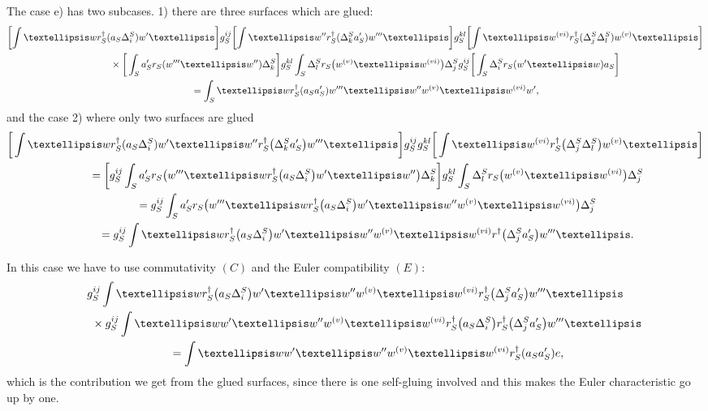 \documentclass[11pt]{article}
\def\idagger{r^{\dagger}}
\def\res{r}
\begin{document}
The case e) has two subcases. 1) there are three surfaces which are
glued:
\begin{gather*}
\bigg[\!\int \dots w  \idagger_{S}(a_S \Delta^{S}_{i}) w'\dots \bigg]
g^{ij}_{S}
\bigg[\!\int \dots w''  \idagger_{S}( \Delta^{S}_{k} a'_S) w'''\dots \bigg] g^{kl}_{S}
\bigg[\!\int  \dots w^{\rm (vi)} \idagger_{S}( \Delta_j^{S} \Delta_l^{S}) w^{\rm (v)} \dots \bigg]   \\
\qquad{}\times\bigg[ \int_S a'_S\res_S( w'''\dots w'' )\Delta^{S}_{k} \bigg ] g^{kl}_{S}
\int _S  \Delta_l^S \res_S\big(w^{\rm (v)} \dots w^{\rm (vi)}\big)\Delta_j^{S}
  g^{ij}_{S}\bigg[\int_S  \Delta^{S}_{i}\res_S( w' \dots w)a_S\bigg]   \\
\qquad{} = \int_S \dots w\idagger_S(a_Sa'_S) w'''\dots w'' w^{\rm (v)} \dots w^{\rm (vi)} w',
\end{gather*}
and the case 2) where only two surfaces are glued %
\begin{gather*}
\bigg[\int \dots w  \idagger_{S}(a_S \Delta^{S}_{i}) w' \dots w''
\idagger_{S}\big( \Delta^{S}_{k} a'_S\big) w'''\dots \bigg] g^{ij}_{S}
g^{kl}_{S} \bigg[\int  \dots w^{\rm (vi)} \idagger_{S}\big( \Delta_j^{S} \Delta_l^{S}\big) w^{\rm (v)} \dots \bigg]   \\
\qquad{} =\bigg[
 g^{ij}_{S} \int_S a'_S\res_S\big( w'''\dots w  \idagger_{S}\big(a_S \Delta^{S}_{i}\big) w' \dots w'' \big)\Delta^{S}_{k}  \bigg] g^{kl}_{S}
 \int _S \Delta_l^S \res_S\big(w^{\rm (v)} \dots w^{\rm (vi)} \big) \Delta_j^{S}
 \\
\qquad{} = g^{ij}_{S} \int_S a'_S\res_S\big( w'''\dots w  \idagger_{S}\big(a_S \Delta^{S}_{i}\big) w' \dots w'' w^{\rm (v)} \dots w^{\rm (vi)} \big) \Delta_j^{S} \\
\qquad{}=  g^{ij}_{S}\int  \dots w  \idagger_{S}\big(a_S \Delta^{S}_{i}\big) w' \dots w'' w^{\rm (v)} \dots w^{\rm (vi)} \idagger\big(\Delta_j^S a_S'\big)w''' \dots.
\end{gather*}

In this case we have to use commutativity $(C)$ and
the Euler compatibility $(E)$:
\begin{gather*}
  g^{ij}_{S}\int  \dots w  \idagger_{S}\big(a_S \Delta^{S}_{i}\big) w' \dots w'' w^{\rm (v)} \dots w^{\rm (vi)} \idagger_S\big(\Delta_j^S a_S'\big)w''' \dots \\
\qquad {}\times g^{ij}_{S}\int  \dots w   w' \dots w'' w^{\rm (v)} \dots w^{\rm (vi)}\idagger_{S}\big(a_S \Delta^{S}_{i}\big) \idagger_S\big(\Delta_j^S a_S'\big)w''' \dots \\
\qquad{} =\int \dots w  w' \dots w'' w^{\rm (v)} \dots w^{\rm (vi)} \idagger_S(a_Sa'_S) e,
\end{gather*}
which is the contribution we get from the glued surfaces, since there is one self-gluing involved  and
this makes the Euler characteristic go up by one.
\end{document}
